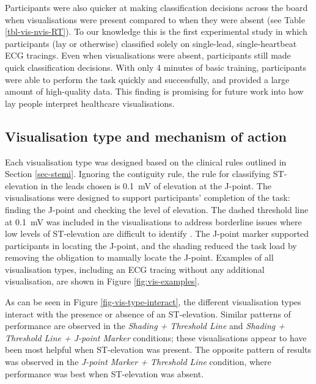 \documentclass[
  10pt,
  letterpaper,
]{article}
\begin{document}
Participants were also quicker at making classification decisions across
the board when visualisations were present compared to when they were
absent (see Table \ref{tbl-vis-nvis-RT}). To our knowledge this is the
first experimental study in which participants (lay or otherwise)
classified solely on single-lead, single-heartbeat ECG tracings. Even
when visualisations were absent, participants still made quick
classification decisions. With only 4 minutes of basic training,
participants were able to perform the task quickly and successfully, and
provided a large amount of high-quality data. This finding is promising
for future work into how lay people interpret healthcare visualisations.

\subsection{Visualisation type and mechanism of
action}\label{sec-vis-type-mech}

Each visualisation type was designed based on the clinical rules
outlined in Section \ref{sec-stemi}. Ignoring the contiguity rule, the
rule for classifying ST-elevation in the leads chosen is 0.1~mV of
elevation at the J-point. The visualisations were designed to support
participants' completion of the task: finding the J-point and checking
the level of elevation. The dashed threshold line at 0.1~mV was included
in the visualisations to address borderline issues where low levels of
ST-elevation are difficult to identify \citep{erling_2004}. The J-point
marker supported participants in locating the J-point, and the shading
reduced the task load by removing the obligation to manually locate the
J-point. Examples of all visualisation types, including an ECG tracing
without any additional visualisation, are shown in Figure
\ref{fig:vis-examples}.

As can be seen in Figure \ref{fig-vis-type-interact}, the different
visualisation types interact with the presence or absence of an
ST-elevation. Similar patterns of performance are observed in the
\emph{Shading + Threshold Line} and
\emph{Shading + Threshold Line + J-point Marker} conditions; these
visualisations appear to have been most helpful when ST-elevation was
present. The opposite pattern of results was observed in the
\emph{J-point Marker + Threshold Line} condition, where performance was
best when ST-elevation was absent.
\end{document}
